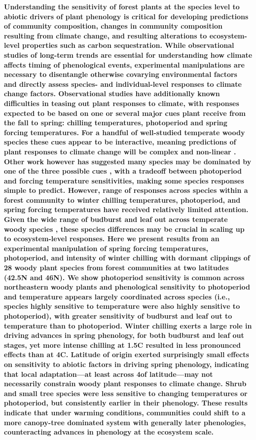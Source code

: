 \documentclass[11pt]{article}
\begin{document}
\textbf{Understanding the sensitivity of forest plants at the species level to abiotic drivers of plant phenology is critical for developing predictions of community composition, changes in community composition resulting from climate change, and resulting alterations to ecosystem-level properties such as carbon sequestration.  While observational studies of long-term trends are essential for understanding how climate affects timing of phenological events, experimental manipulations are necessary to disentangle otherwise covarying environmental factors and directly assess species- and individual-level responses to climate change factors. Observational studies have additionally known difficulties in teasing out plant responses to climate, with responses expected to be based on one or several major cues plant receive from the fall to spring: chilling temperatures, photoperiod and spring forcing temperatures. For a handful of well-studied temperate woody species these cues appear to be interactive, meaning predictions of plant responses to climate change will be complex and non-linear \cite{Chuine:1999aa}. Other work however has suggested many species may be dominated by one of the three possible cues \cite{Korner:2010}, with a tradeoff between photoperiod and forcing temperature sensitivities, making some species responses simple to predict. However, range of responses across species within a forest community to winter chilling temperatures, photoperiod, and spring forcing temperatures have received relatively limited attention. Given the wide range of budburst and leaf out across temperate woody species \cite{Polgar:2011aa}, these species differences may be crucial in scaling up to ecosystem-level responses. Here we present results from an experimental manipulation of spring forcing temperatures, photoperiod, and intensity of winter chilling with dormant clippings of 28 woody plant species from forest communities at two latitudes (42.5\degree N and 46\degree N). We show photoperiod sensitivity is common across northeastern woody plants and phenological sensitivity to photoperiod and temperature appears largely coordinated across species (i.e., species highly sensitive to temperature were also highly sensitive to photoperiod), with greater sensitivity of budburst and leaf out to temperature than to photoperiod. Winter chilling exerts a large role in driving advances in spring phenology, for both budburst and leaf out stages, yet more intense chilling at 1.5\degree C resulted in less pronounced effects than at 4\degree C. Latitude of origin exerted surprisingly small effects on sensitivity to abiotic factors in driving spring phenology, indicating that local adaptation---at least across 4\degree of latitude---may not necessarily constrain woody plant responses to climate change. Shrub and small tree species were less sensitive to changing temperatures or photoperiod, but consistently earlier in their phenology. These results indicate that under warming conditions, communities could shift to a more canopy-tree dominated system with generally later phenologies, counteracting advances in phenology at the ecosystem scale.}
\end{document}
